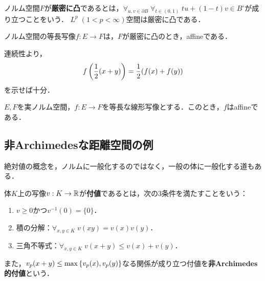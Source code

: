 \documentclass[uplatex,dvipdfmx]{jsreport}
\begin{document}
\begin{definition}
    ノルム空間$F$が\textbf{厳密に凸}であるとは，$\forall_{u,v\in\partial B}\;\forall_{t\in(0,1)}\;tu+(1-t)v\in B^\circ$が成り立つことをいう．
    $L^p\;(1<p<\infty)$空間は厳密に凸である．
\end{definition}

\begin{theorem}
    ノルム空間の等長写像$f:E\to F$は，$F$が厳密に凸のとき，affineである．
\end{theorem}
\begin{Proof}
    連続性より，
    \[f\left(\frac{1}{2}(x+y)\right)=\frac{1}{2}(f(x)+f(y))\]
    を示せば十分．
\end{Proof}

\begin{theorem}
    $E,F$を実ノルム空間，$f:E\to F$を等長な線形写像とする．このとき，$f$はaffineである．
\end{theorem}

\subsection{非Archimedesな距離空間の例}


\begin{tcolorbox}[colframe=ForestGreen, colback=ForestGreen!10!white,breakable,colbacktitle=ForestGreen!40!white,coltitle=black,fonttitle=\bfseries\sffamily,
    title=]
        絶対値の概念を，ノルムに一般化するのではなく，一般の体に一般化する道もある．
\end{tcolorbox}

\begin{definition}[valuation]
    体$K$上の写像$v:K\to\mathbb{R}$が\textbf{付値}であるとは，次の3条件を満たすことをいう：
    \begin{enumerate}
        \item $v\ge0$かつ$v^{-1}(0)=\{0\}$．
        \item 積の分解：$\forall_{x,y\in K}\;v(xy)=v(x)v(y)$．
        \item 三角不等式：$\forall_{x,y\in K}\;v(x+y)\le v(x)+v(y)$．
    \end{enumerate}
    また，$v_p(x+y)\le\max\left\{v_p(x),v_p(y)\right\}$なる関係が成り立つ付値を\textbf{非Archimedes的付値}という．
\end{definition}
\end{document}
